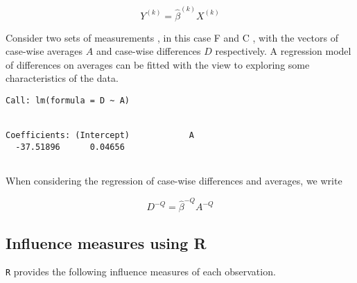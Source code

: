 \documentclass[12pt, a4paper]{report}
\theoremstyle{plain}
\theoremstyle{definition}
\theoremstyle{remark}
\begin{document}
\begin{equation}
Y^{(k)} = \hat{\beta}^{(k)}X^{(k)}
\end{equation}


Consider two sets of measurements , in this case F and C , with the vectors of case-wise averages $A$ and case-wise differences $D$ respectively. A regression model of differences on averages can be fitted with the view to exploring some characteristics of the data.


\begin{verbatim}
Call: lm(formula = D ~ A)


Coefficients: (Intercept)            A
  -37.51896      0.04656


\end{verbatim}








When considering the regression of case-wise differences and averages, we write


\begin{equation}
D^{-Q} = \hat{\beta}^{-Q}A^{-Q}
\end{equation}






\subsection{Influence measures using R} %
\texttt{R} provides the following influence measures of each observation.


\end{document}
